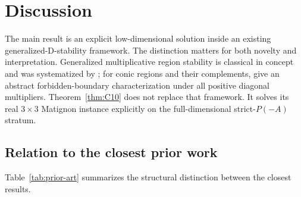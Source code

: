 \section{Discussion}
\label{sec:discussion}

The main result is an explicit low-dimensional solution inside an existing generalized-D-stability framework. The distinction matters for both novelty and interpretation. Generalized multiplicative region stability is classical in concept and was systematized by \citet{Kushel2019}; for conic regions and their complements, \citet{KushelPavani2022} give an abstract forbidden-boundary characterization under all positive diagonal multipliers. Theorem~\ref{thm:C10} does not replace that framework. It solves its real \(3\times3\) Matignon instance explicitly on the full-dimensional strict-\(P(-A)\) stratum.

\subsection{Relation to the closest prior work}

Table~\ref{tab:prior-art} summarizes the structural distinction between the closest results.

